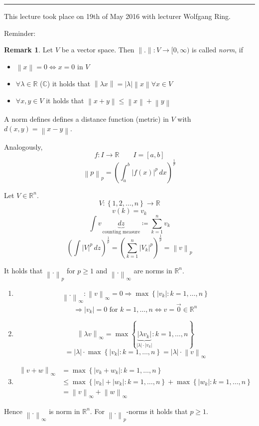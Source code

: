 \documentclass[a4paper,landscape,twocolumn]{article}
\theoremstyle{definition}
\newtheorem{rem}{Remark}
\newcommand\set[1]{\left\{#1\right\}}
\newcommand\abs[1]{\left|#1\right|}
\newcommand\meta[3]{\hrule{} This #1 took place on #2 with lecturer #3.\par}
\newcommand\norm[1]{\left\|#1\right\|}
\newcommand\inorm[1]{\left\|#1\right\|_\infty}
\begin{document}
\meta{lecture}{19th of May 2016}{Wolfgang Ring}

Reminder:
\begin{rem}
  Let $V$ be a vector space. Then $\|.\|: V \to [0,\infty)$ is called \emph{norm}, if
  \begin{itemize}
    \item $\norm{x} = 0 \Leftrightarrow x = 0$ in $V$
    \item $\forall \lambda \in \mathbb R$ ($\mathbb C$) it holds that $\norm{\lambda x} = \abs{\lambda} \norm{x} \forall x \in V$
    \item $\forall x,y \in V$ it holds that $\norm{x + y} \leq \norm{x} + \norm{y}$
  \end{itemize}
  A norm defines defines a distance function (metric) in $V$ with $d(x,y) = \norm{x - y}$.

  Analogously,
  \[ f: I \to \mathbb R \qquad I = [a,b] \]
  \[ \norm{p}_p = \left(\int_a^b \abs{f(x)}^p \, dx\right)^{\frac1p} \]

  Let $V \in \mathbb R^n$.
  \[ V: \set{1, 2, \ldots, n} \to \mathbb R \]
  \[ v(k) = v_k \]
  \[ \int v \, \underbrace{dz}_{\text{counting measure}} \coloneqq \sum_{k=1}^{n} v_k \]
  \[
    \left(\int \abs{V}^p \, dz\right)^{\frac1p}
    = \left(\sum_{k=1}^n \abs{V_k}^p\right)^{\frac1p}
    = \norm{v}_p
  \]

  It holds that $\norm{.}_p$ for $p \geq 1$ and $\inorm{.}$ are norms in $\mathbb R^n$.

  \begin{enumerate}
    \item
      \[ \inorm{.}: \inorm{v} = 0 \Rightarrow \max\set{\abs{v_k}: k = 1, \ldots, n} \]
      \[ \Rightarrow \abs{v_k} = 0 \text{ for } k = 1, \ldots, n \Leftrightarrow v = \vec{0} \in \mathbb R^n \]
    \item
      \[ \inorm{\lambda v} = \max\set{\underbrace{\abs{\lambda v_k}}_{\abs{\lambda} \cdot \abs{v_k}}: k = 1, \ldots, n} \]
      \[ = \abs{\lambda} \cdot \max\set{\abs{v_k}: k = 1, \ldots, n} = \abs{\lambda} \cdot \inorm{v} \]
    \item
      \begin{align*}
        \inorm{v + w}
        &= \max\set{\abs{v_k + w_k}: k = 1, \ldots, n} \\
        &\leq \max\set{\abs{v_k} + \abs{w_k}: k = 1, \ldots, n} + \max\set{\abs{w_k}: k = 1, \ldots, n} \\
        &= \inorm{v} + \inorm{w}
      \end{align*}
  \end{enumerate}
  Hence $\inorm{.}$ is norm in $\mathbb R^n$.
  For $\norm{.}_p$-norms it holds that $p \geq 1$.


\end{rem}
\end{document}
